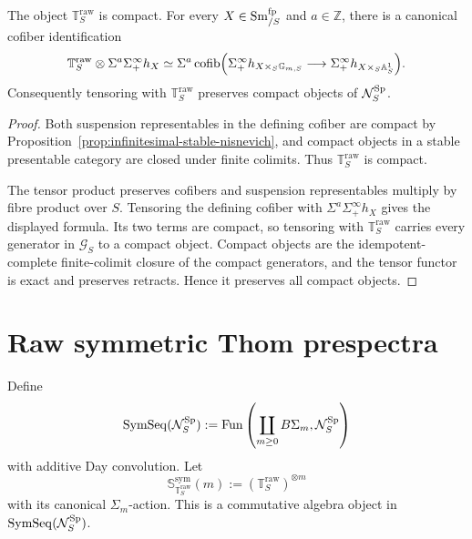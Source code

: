 \begin{proposition}
\label{prop:infinitesimal-raw-thom-properties}
The object $\mathbb T_S^{\mathrm{raw}}$ is compact.  For every
$X\in\operatorname{Sm}^{\mathrm{fp}}_{/S}$ and $a\in\mathbb Z$, there is a canonical
cofiber identification
\[
\begin{aligned}
    \mathbb T_S^{\mathrm{raw}}
    \otimes
    \Sigma^a\Sigma^\infty_+h_X
    \simeq
    \Sigma^a\operatorname{cofib}\Bigl(
        \Sigma^\infty_+h_{X\times_S\mathbb G_{m,S}}
        \longrightarrow
        \Sigma^\infty_+h_{X\times_S\mathbb A^1_S}
    \Bigr).
\end{aligned}
\]
Consequently tensoring with $\mathbb T_S^{\mathrm{raw}}$ preserves compact
objects of $\mathcal N_S^{\mathrm{Sp}}$.
\end{proposition}

\begin{proof}
Both suspension representables in the defining cofiber are compact by
Proposition~\ref{prop:infinitesimal-stable-nisnevich}, and compact objects in
a stable presentable category are closed under finite colimits.  Thus
$\mathbb T_S^{\mathrm{raw}}$ is compact.

The tensor product preserves cofibers and suspension representables multiply
by fibre product over $S$.  Tensoring the defining cofiber with
$\Sigma^a\Sigma^\infty_+h_X$ gives the displayed formula.  Its two terms are
compact, so tensoring with $\mathbb T_S^{\mathrm{raw}}$ carries every
generator in $\mathcal G_S$ to a compact object.  Compact objects are the
idempotent-complete finite-colimit closure of the compact generators, and the
tensor functor is exact and preserves retracts.  Hence it preserves all
compact objects.
\end{proof}

\section{Raw symmetric Thom prespectra}
\label{sec:infinitesimal-raw-stable-coefficients}

\begin{definition}
\label{def:infinitesimal-symmetric-sequences}
Define
\[
    \operatorname{SymSeq}(\mathcal N_S^{\mathrm{Sp}})
    :=
    \operatorname{Fun}
    \left(
        \coprod_{m\geq0}B\Sigma_m,
        \mathcal N_S^{\mathrm{Sp}}
    \right)
\]
with additive Day convolution.  Let
\[
    \mathbb S_{\mathbb T_S^{\mathrm{raw}}}^{\mathrm{sym}}(m)
    :=
    (\mathbb T_S^{\mathrm{raw}})^{\otimes m}
\]
with its canonical $\Sigma_m$-action.  This is a commutative algebra object in
$\operatorname{SymSeq}(\mathcal N_S^{\mathrm{Sp}})$.
\end{definition}

